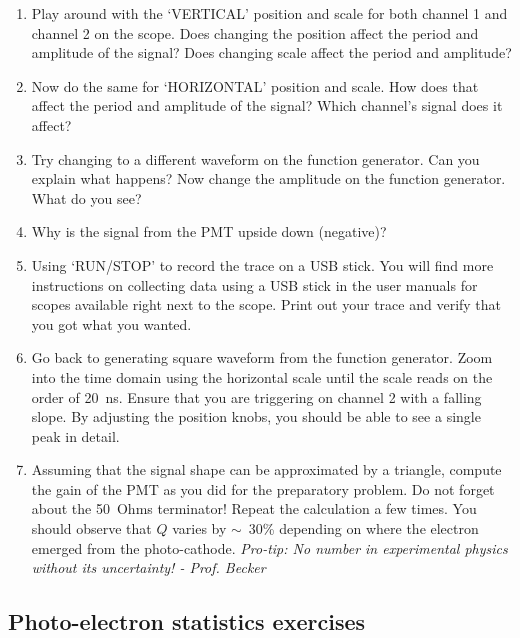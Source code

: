 \documentclass[10pt,aps,twocolumn,secnumarabic,balancelastpage,amsmath,amssymb,nofootinbib,floatfix]{revtex4}
\begin{document}
\begin{enumerate}
\item Play around with the `VERTICAL' position and scale for both channel 1 and channel 2 on the scope. Does changing the position affect the period and amplitude of the signal? Does changing scale affect the period and amplitude? 

\item Now do the same for `HORIZONTAL' position and scale. How does that affect the period and amplitude of the signal? Which channel's signal does it affect?

\item Try changing to a different waveform on the function generator. Can you explain what happens? Now change the amplitude on the function generator. What do you see?

\item Why is the signal from the PMT upside down (negative)?

\item Using `RUN/STOP' to record the trace on a USB stick. You will find more instructions on collecting data using a USB stick in the user manuals for scopes available right next to the scope. Print out your trace and verify that you got what you wanted. 

\item Go back to generating square waveform from the function generator. Zoom into the time domain using the horizontal scale until the scale reads on the order of 20~ns. Ensure that you are triggering on channel 2 with a falling slope. By adjusting the position knobs, you should be able to see a single peak in detail. 

\item Assuming that the signal shape can be approximated by a triangle, compute the gain of the PMT as you did for the preparatory problem. Do not forget about the 50~Ohms terminator! Repeat the calculation a few times. You should observe that $Q$ varies by $\sim$~30\% depending on where the electron emerged from the photo-cathode. {\it Pro-tip: No number in experimental physics without its uncertainty! - Prof. Becker}

\end{enumerate}

\subsection{Photo-electron statistics exercises}
\end{document}
